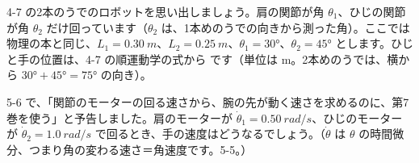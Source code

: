 \label{bk:7-2:jacobi}

4-7 の2本のうでのロボットを思い出しましょう。肩の関節が角 $\theta_1$、ひじの関節が角 $\theta_2$ だけ回っています（$\theta_2$ は、1本めのうでの向きから測った角）。ここでは物理の本と同じ、$L_1=\qty{0.30}{m}$、$L_2=\qty{0.25}{m}$、$\theta_1=30°$、$\theta_2=45°$ とします。ひじと手の位置は、4-7 の順運動学の式から
です（単位は m。2本めのうでは、横から $30°+45°=75°$ の向き）。

5-6 で、「関節のモーターの回る速さから、腕の先が動く速さを求めるのに、第7巻を使う」と予告しました。肩のモーターが $\dot\theta_1=\qty{0.50}{rad/s}$、ひじのモーターが $\dot\theta_2=\qty{1.0}{rad/s}$ で回るとき、手の速度はどうなるでしょう。（$\dot\theta$ は $\theta$ の時間微分、つまり角の変わる速さ＝角速度です。5-5。）

